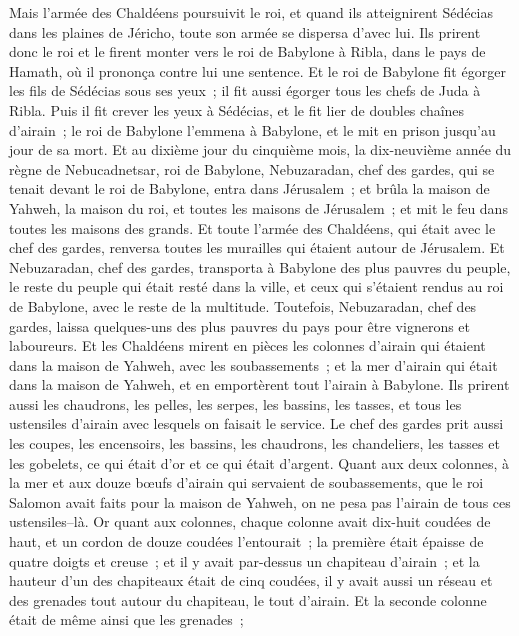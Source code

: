 \begin{multicols}{2}
Mais l'armée des Chaldéens poursuivit le roi, et quand ils atteignirent Sédécias dans les plaines de Jéricho, toute son armée se dispersa d'avec lui.
Ils prirent donc le roi et le firent monter vers le roi de Babylone à Ribla, dans le pays de Hamath, où il prononça contre lui une sentence.
Et le roi de Babylone fit égorger les fils de Sédécias sous ses yeux~; il fit aussi égorger tous les chefs de Juda à Ribla.
Puis il fit crever les yeux à Sédécias, et le fit lier de doubles chaînes d'airain~; le roi de Babylone l'emmena à Babylone, et le mit en prison jusqu'au jour de sa mort.
Et au dixième jour du cinquième mois, la dix-neuvième année du règne de Nebucadnetsar, roi de Babylone, Nebuzaradan, chef des gardes, qui se tenait devant le roi de Babylone, entra dans Jérusalem~;
et brûla la maison de Yahweh, la maison du roi, et toutes les maisons de Jérusalem~; et mit le feu dans toutes les maisons des grands.
Et toute l'armée des Chaldéens, qui était avec le chef des gardes, renversa toutes les murailles qui étaient autour de Jérusalem.
Et Nebuzaradan, chef des gardes, transporta à Babylone des plus pauvres du peuple, le reste du peuple qui était resté dans la ville, et ceux qui s'étaient rendus au roi de Babylone, avec le reste de la multitude.
Toutefois, Nebuzaradan, chef des gardes, laissa quelques-uns des plus pauvres du pays pour être vignerons et laboureurs.
Et les Chaldéens mirent en pièces les colonnes d'airain qui étaient dans la maison de Yahweh, avec les soubassements~; et la mer d'airain qui était dans la maison de Yahweh, et en emportèrent tout l'airain à Babylone.
Ils prirent aussi les chaudrons, les pelles, les serpes, les bassins, les tasses, et tous les ustensiles d'airain avec lesquels on faisait le service.
Le chef des gardes prit aussi les coupes, les encensoirs, les bassins, les chaudrons, les chandeliers, les tasses et les gobelets, ce qui était d'or et ce qui était d'argent.
Quant aux deux colonnes, à la mer et aux douze bœufs d'airain qui servaient de soubassements, que le roi Salomon avait faits pour la maison de Yahweh, on ne pesa pas l'airain de tous ces ustensiles–là.
Or quant aux colonnes, chaque colonne avait dix-huit coudées de haut, et un cordon de douze coudées l'entourait~; la première était épaisse de quatre doigts et creuse~;
et il y avait par-dessus un chapiteau d'airain~; et la hauteur d'un des chapiteaux était de cinq coudées, il y avait aussi un réseau et des grenades tout autour du chapiteau, le tout d'airain. Et la seconde colonne était de même ainsi que les grenades~;

\end{multicols}
